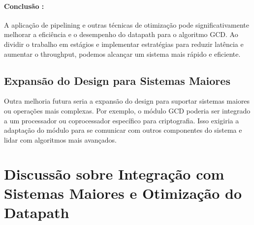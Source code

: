 \documentclass[a4paper,11pt]{article} %
\begin{document}




\paragraph{Conclusão :}
A aplicação de pipelining e outras técnicas de otimização pode significativamente melhorar a eficiência e o desempenho do datapath para o algoritmo GCD. Ao dividir o trabalho em estágios e implementar estratégias para reduzir latência e aumentar o throughput, podemos alcançar um sistema mais rápido e eficiente.


\subsection{Expansão do Design para Sistemas Maiores}

Outra melhoria futura seria a expansão do design para suportar sistemas maiores ou operações mais complexas. Por exemplo, o módulo GCD poderia ser integrado a um processador ou coprocessador específico para criptografia. Isso exigiria a adaptação do módulo para se comunicar com outros componentes do sistema e lidar com algoritmos mais avançados.




\section{Discussão sobre Integração com Sistemas Maiores e Otimização do Datapath}
\end{document}
